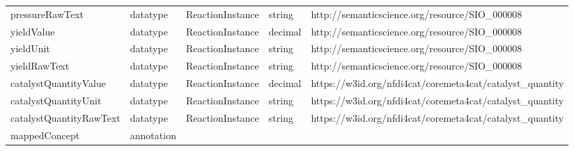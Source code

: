 \begin{tabular}{lllll}
pressureRawText & datatype & ReactionInstance & string & http://semanticscience.org/resource/SIO\_000008 \\
yieldValue & datatype & ReactionInstance & decimal & http://semanticscience.org/resource/SIO\_000008 \\
yieldUnit & datatype & ReactionInstance & string & http://semanticscience.org/resource/SIO\_000008 \\
yieldRawText & datatype & ReactionInstance & string & http://semanticscience.org/resource/SIO\_000008 \\
catalystQuantityValue & datatype & ReactionInstance & decimal & https://w3id.org/nfdi4cat/coremeta4cat/catalyst\_quantity \\
catalystQuantityUnit & datatype & ReactionInstance & string & https://w3id.org/nfdi4cat/coremeta4cat/catalyst\_quantity \\
catalystQuantityRawText & datatype & ReactionInstance & string & https://w3id.org/nfdi4cat/coremeta4cat/catalyst\_quantity \\
mappedConcept & annotation &  &  &  \\
\bottomrule
\end{tabular}
